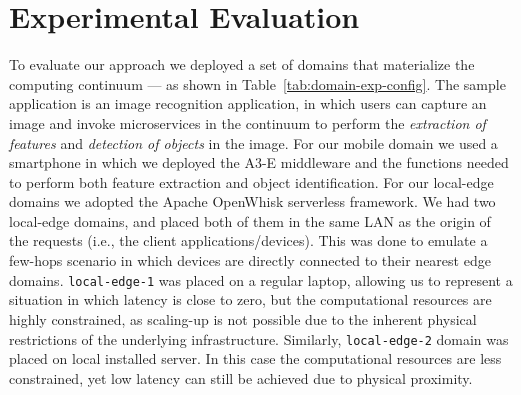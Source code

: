 \section{Experimental Evaluation}\label{sec:evaluation}





To evaluate our approach we deployed a set of domains that materialize the computing continuum --- as shown in Table~\ref{tab:domain-exp-config}. The sample application is an image recognition application, in which users can capture an image and invoke microservices in the continuum to perform the \textit{extraction of features} and \textit{detection of objects} in the image. For our mobile domain we used a smartphone in which we deployed the A3-E middleware and the functions needed to perform both feature extraction and object identification. For our local-edge domains we adopted the Apache OpenWhisk serverless framework. We had two local-edge domains, and placed both of them in the same LAN as the origin of the requests (i.e., the client applications/devices). This was done to emulate a few-hops scenario in which devices are directly connected to their nearest edge domains. \texttt{local-edge-1} was placed on a regular laptop, allowing us to represent a situation in which latency is close to zero, but the computational resources are highly constrained, as scaling-up is not possible due to the inherent physical restrictions of the underlying infrastructure. Similarly, \texttt{local-edge-2} domain was placed on local installed server. In this case the computational resources are less constrained, yet low latency can still be achieved due to physical proximity.

